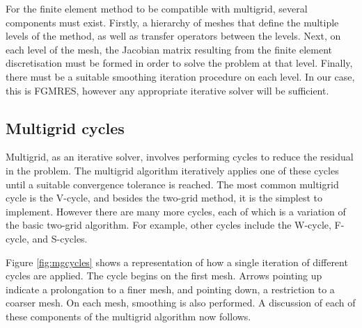 For the finite element method to be compatible with multigrid, several components must exist.
Firstly, a hierarchy of meshes that define the multiple levels of the method, as well as transfer operators between the levels.
Next, on each level of the mesh, the Jacobian matrix resulting from the finite element discretisation must be formed in order to solve the problem at that level.
Finally, there must be  a suitable smoothing iteration procedure on each level.
In our case, this is FGMRES, however any appropriate iterative solver will be sufficient.




\subsection{Multigrid cycles}

Multigrid, as an iterative solver, involves performing cycles to reduce the residual in the problem.
The multigrid algorithm iteratively applies one of these cycles until a suitable convergence tolerance is reached.
The most common multigrid cycle is the V-cycle, and besides the two-grid method, it is the simplest to implement.
However there are many more cycles, each of which is a variation of the basic two-grid algorithm.
For example, other cycles include the W-cycle, F-cycle, and S-cycles.

Figure \ref{fig:mgcycles} shows a representation of how a single iteration of different cycles are applied.
The cycle begins on the first mesh.
Arrows pointing up indicate a prolongation to a finer mesh, and pointing down, a restriction to a coarser mesh.
On each mesh, smoothing is also performed.
A discussion of each of these components of the multigrid algorithm now follows.


